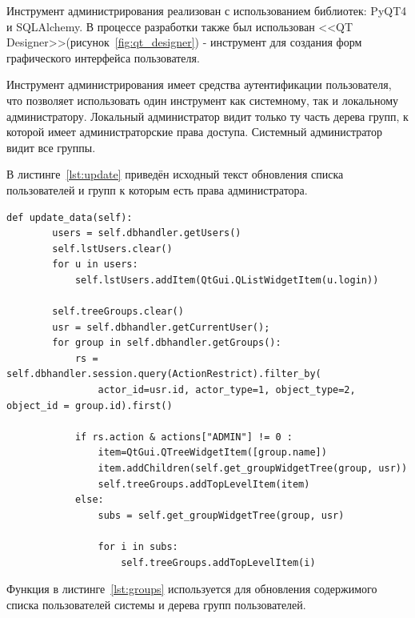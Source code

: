 \documentclass[utf8,usehyperref,12pt]{G7-32}
\begin{document}
Инструмент администрирования реализован с использованием библиотек: PyQT4\cite{pyqt4_ref} и SQLAlchemy\cite{sqlalchemy}. В процессе разработки также был использован <<QT Designer>>(рисунок~\ref{fig:qt_designer}) - инструмент для создания форм графического интерфейса пользователя.
 
Инструмент администрирования имеет средства аутентификации пользователя, что позволяет использовать один инструмент как системному, так и локальному администратору. Локальный администратор видит только ту часть дерева групп, к которой имеет администраторские права доступа. Системный администратор видит все группы.

В листинге~\ref{lst:update} приведён исходный текст обновления списка пользователей и групп к которым есть права администратора. 

\lstset{language=Python,caption=Обновление данных в графическом интерфейсе,label=lst:update}
\begin{lstlisting}
def update_data(self):
        users = self.dbhandler.getUsers()
        self.lstUsers.clear()
        for u in users:
            self.lstUsers.addItem(QtGui.QListWidgetItem(u.login))                
        
        self.treeGroups.clear()        
        usr = self.dbhandler.getCurrentUser();        
        for group in self.dbhandler.getGroups():            
            rs = self.dbhandler.session.query(ActionRestrict).filter_by(
            	actor_id=usr.id, actor_type=1, object_type=2, object_id = group.id).first()
            	
            if rs.action & actions["ADMIN"] != 0 :
                item=QtGui.QTreeWidgetItem([group.name])
                item.addChildren(self.get_groupWidgetTree(group, usr))
                self.treeGroups.addTopLevelItem(item)
            else:
                subs = self.get_groupWidgetTree(group, usr)
                
                for i in subs:
                    self.treeGroups.addTopLevelItem(i)
\end{lstlisting}

Функция в листинге~\ref{lst:groups} используется для обновления содержимого списка пользователей системы и дерева групп пользователей. 
\end{document}
